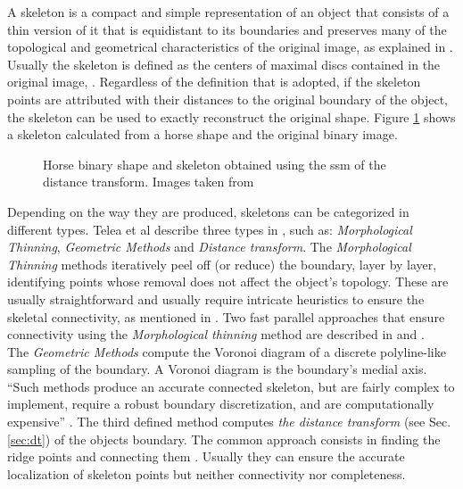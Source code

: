 A skeleton is a compact and simple representation of an object that consists of a thin
version of it that is equidistant to its boundaries and preserves many of
the topological and geometrical characteristics of the original image, as explained in
\cite{wikipedia:skeleton,ssm,augmented}. Usually the skeleton is defined as the centers
of maximal discs contained in the original image, \cite{ssm,augmented}.
Regardless of the definition that is adopted, if the skeleton points are attributed with their distances
to the original boundary of the object, the skeleton can be used to exactly 
reconstruct the original shape. Figure \ref{fig:genskeleton} shows a skeleton calculated
from a horse shape and the original binary image.\\

\begin{figure}[h t b p ! H]
  \centering
\qquad
  \caption{Horse binary shape and skeleton obtained using the ssm of the distance transform. Images taken from \cite{ssm}}
  \label{fig:genskeleton}
\end{figure}


Depending on the way they are produced, skeletons can be categorized in different types.
Telea et al describe three types in \cite{augmented}, such as: \emph{Morphological Thinning},
\emph{Geometric Methods} and \emph{Distance transform}. The \emph{Morphological Thinning} methods iteratively peel off (or reduce) the boundary, layer by layer, identifying
points whose removal does not affect the object's topology. These are usually 
straightforward and usually require intricate heuristics to ensure the skeletal
connectivity, as mentioned in \cite{augmented}. Two fast parallel approaches that
ensure connectivity using the \emph{Morphological thinning} method are described
in \cite{onepass} and \cite{thinning}.\\
The \emph{Geometric Methods} compute the Voronoi diagram of a discrete polyline-like
sampling of the boundary. A Voronoi diagram is the boundary's medial axis. ``Such 
methods produce an accurate connected skeleton, but are fairly complex to implement,
require a robust boundary discretization, and are computationally expensive''
\cite[p.251]{augmented}. The third defined method computes \emph{the distance transform}
(see Sec. \ref{sec:dt}) of the objects boundary. The common approach consists in
finding the ridge points and connecting them \cite{maxima,euclideancentre,ridgeineuc}.
 Usually they can ensure the accurate localization of skeleton points 
but neither connectivity nor completeness.\\

